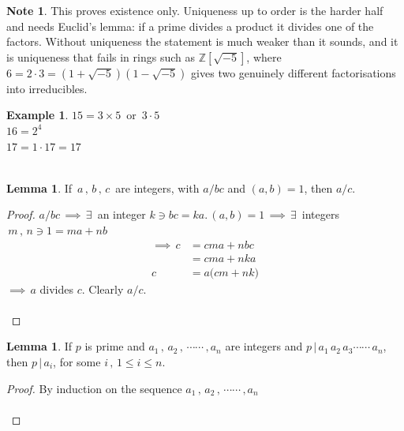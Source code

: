 \documentclass[11pt,a4paper]{article}
\theoremstyle{definition}
\newtheorem{exa}[thm]{Example}
\newtheorem{lem}[thm]{Lemma}
\newtheorem*{note}{Note}
\begin{document}
\begin{note}
This proves existence only. Uniqueness up to order is the harder half and needs
Euclid's lemma: if a prime divides a product it divides one of the factors.
Without uniqueness the statement is much weaker than it sounds, and it is
uniqueness that fails in rings such as $\mathbb{Z}\left[\sqrt{-5}\right]$, where
$6 = 2\cdot3 = \left(1+\sqrt{-5}\right)\left(1-\sqrt{-5}\right)$ gives two
genuinely different factorisations into irreducibles.
\end{note}




\begin{exa}
$15 = 3 \times 5\, $ or $\, 3\cdot 5$\\

$16 = 2^4$\\

$17 = 1\cdot 17 = 17$\\\\
\end{exa}





\begin{lem}
If $\, a\, , \, b\, , \, c\,$ are integers, with $a/bc$ and $(a,b) = 1$, then $a/c$.\\
\end{lem}


\begin{proof}
$a/bc \, \implies\, \exists\, $ an integer $k\ni bc = ka.\, (a,b) = 1\, \implies \, \exists\,$ integers $\, m\, ,\, n\ni 1 = ma + nb $
\begin{align*}
\implies\, c & = cma + nbc\\
 &  = cma + nka\\
c & = a\big(cm + nk\big)
\end{align*}
$\implies\, a$ divides $c$. Clearly $a/c$.\\\\
\end{proof}






\begin{lem}
If $p$ is prime and $a_1\, ,\, a_2\, , \, \cdots\cdots\, , a_n$ are integers and $p\, |\, a_1\,a_2\,a_3\cdots\cdots\,a_n$, then $p\, |\,a_i$, for some $i\, , \, 1\leq i\leq n$.\\
\end{lem}

\begin{proof}
By induction on the sequence $a_1\, ,\, a_2\, , \, \cdots\cdots\, , a_n$ \\\\
\end{proof}
\end{document}
